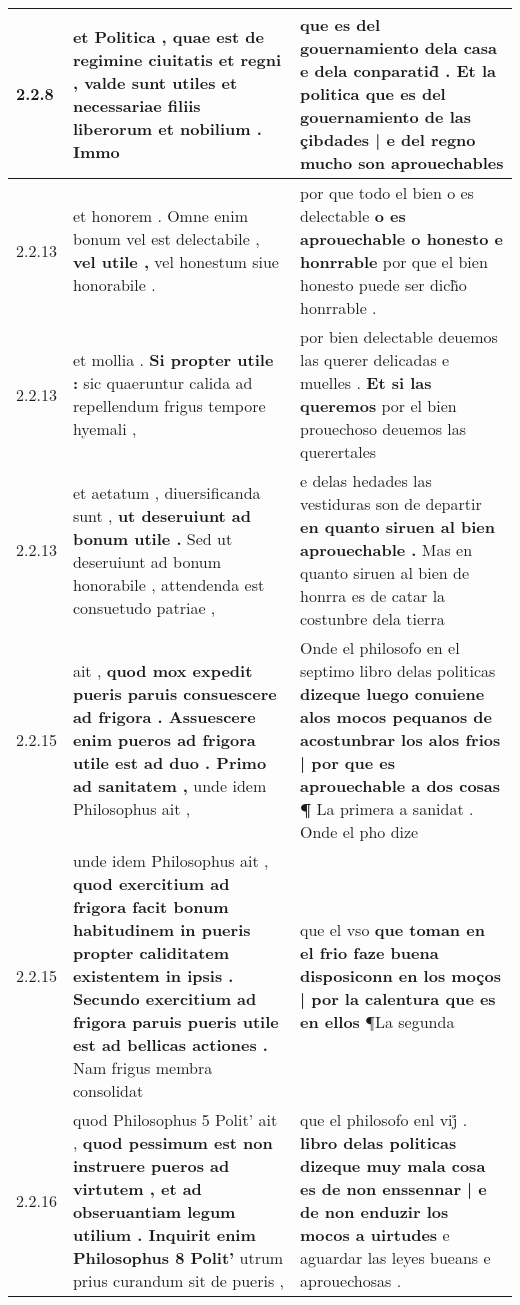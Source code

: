 \begin{tabular}{|p{1cm}|p{6.5cm}|p{6.5cm}|}
2.2.8 & et Politica , \textbf{ quae est de regimine ciuitatis et regni , valde sunt utiles } et necessariae filiis liberorum et nobilium . Immo & que es del gouernamiento dela casa e dela conparatid̃ . Et la politica \textbf{ que es del gouernamiento de las çibdades | e del regno } mucho son aprouechables \\\hline
2.2.13 & et honorem . Omne enim bonum vel est delectabile , \textbf{ vel utile , } vel honestum siue honorabile . & por que todo el bien o es delectable \textbf{ o es aprouechable o honesto e honrrable } por que el bien honesto puede ser dich̃o honrrable . \\\hline
2.2.13 & et mollia . \textbf{ Si propter utile : } sic quaeruntur calida ad repellendum frigus tempore hyemali , & por bien delectable deuemos las querer delicadas e muelles . \textbf{ Et si las queremos } por el bien prouechoso deuemos las querertales \\\hline
2.2.13 & et aetatum , diuersificanda sunt , \textbf{ ut deseruiunt ad bonum utile . } Sed ut deseruiunt ad bonum honorabile , attendenda est consuetudo patriae , & e delas hedades las vestiduras son de departir \textbf{ en quanto siruen al bien aprouechable . } Mas en quanto siruen al bien de honrra es de catar la costunbre dela tierra \\\hline
2.2.15 & ait , \textbf{ quod mox expedit pueris paruis consuescere ad frigora . Assuescere enim pueros ad frigora utile est ad duo . Primo ad sanitatem , } unde idem Philosophus ait , & Onde el philosofo en el septimo libro delas politicas \textbf{ dizeque luego conuiene alos mocos pequanos de acostunbrar los alos frios | por que es aprouechable a dos cosas ¶ } La primera a sanidat . Onde el pho dize \\\hline
2.2.15 & unde idem Philosophus ait , \textbf{ quod exercitium ad frigora facit bonum habitudinem in pueris propter caliditatem existentem in ipsis . Secundo exercitium ad frigora paruis pueris utile est ad bellicas actiones . } Nam frigus membra consolidat & que el vso \textbf{ que toman en el frio faze buena disposiconn en los moços | por la calentura que es en ellos } ¶La segunda \\\hline
2.2.16 & quod Philosophus 5 Polit’ ait , \textbf{ quod pessimum est non instruere pueros ad virtutem , et ad obseruantiam legum utilium . Inquirit enim Philosophus 8 Polit’ } utrum prius curandum sit de pueris , & que el philosofo enl vij̊ . \textbf{ libro delas politicas dizeque muy mala cosa es de non enssennar | e de non enduzir los mocos a uirtudes } e aguardar las leyes bueans e aprouechosas . \\\hline

\end{tabular}
